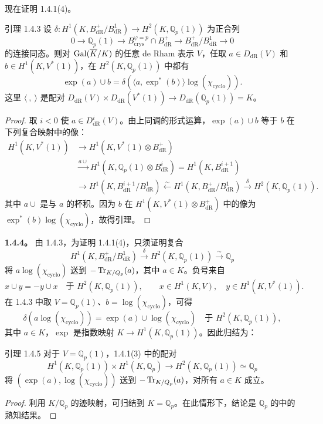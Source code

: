 现在证明 1.4.1(4)。
\begin{statement}{引理 1.4.3}
设 $\delta:H^1(K,B^+_{\mathrm{dR}}/B^1_{\mathrm{dR}})\longrightarrow H^2(K,\mathbb Q_p(1))$ 为正合列
\[
 0\longrightarrow\mathbb Q_p(1)\longrightarrow B_{\mathrm{crys}}^{\varphi=p}\cap B^+_{\mathrm{dR}}
 \longrightarrow B^+_{\mathrm{dR}}/B^1_{\mathrm{dR}}\longrightarrow0
\]
的连接同态。则对 $\operatorname{Gal}(\overline K/K)$ 的任意 de Rham 表示 $V$，任取 $a\in D_{\mathrm{dR}}(V)$ 和 $b\in H^1(K,V^*(1))$，在 $H^2(K,\mathbb Q_p(1))$ 中都有
\[
 \exp(a)\cup b=\delta(\langle a,\exp^*(b)\rangle\log(\chi_{\mathrm{cyclo}})).
\]
这里 $\langle\ ,\ \rangle$ 是配对
$D_{\mathrm{dR}}(V)\times D_{\mathrm{dR}}(V^*(1))\longrightarrow D_{\mathrm{dR}}(\mathbb Q_p(1))=K$。
\end{statement}
\begin{proof}
取 $i<0$ 使 $a\in D^i_{\mathrm{dR}}(V)$。由上同调的形式运算，$\exp(a)\cup b$ 等于 $b$ 在下列复合映射中的像：
\begin{align*}
 H^1(K,V^*(1))&\longrightarrow H^1(K,V^*(1)\otimes B^+_{\mathrm{dR}})\\
 &\xrightarrow{a\cup}H^1(K,\mathbb Q_p(1)\otimes B^i_{\mathrm{dR}})
 =H^1(K,B^{i+1}_{\mathrm{dR}})\\
 &\longrightarrow H^1(K,B^{i+1}_{\mathrm{dR}}/B^1_{\mathrm{dR}})
 \xleftarrow{\sim}H^1(K,B^+_{\mathrm{dR}}/B^1_{\mathrm{dR}})
 \xrightarrow{\delta}H^2(K,\mathbb Q_p(1)).
\end{align*}
其中 $a\cup$ 是与 $a$ 的杯积。因为 $b$ 在 $H^1(K,V^*(1)\otimes B^+_{\mathrm{dR}})$ 中的像为 $\exp^*(b)\log(\chi_{\mathrm{cyclo}})$，故得引理。
\end{proof}

\textbf{1.4.4。} 由 1.4.3，为证明 1.4.1(4)，只须证明复合
\[
 H^1(K,B^+_{\mathrm{dR}}/B^1_{\mathrm{dR}})\xrightarrow{\delta}H^2(K,\mathbb Q_p(1))\xrightarrow{\sim}\mathbb Q_p
\]
将 $a\log(\chi_{\mathrm{cyclo}})$ 送到 $-\operatorname{Tr}_{K/Q_p}(a)$，其中 $a\in K$。负号来自
\[
 x\cup y=-y\cup x\quad\text{于 }H^2(K,\mathbb Q_p(1)),\qquad
 x\in H^1(K,V),\quad y\in H^1(K,V^*(1)).
\]
在 1.4.3 中取 $V=\mathbb Q_p(1)$、$b=\log(\chi_{\mathrm{cyclo}})$，可得
\[
 \delta(a\log(\chi_{\mathrm{cyclo}}))=\exp(a)\cup\log(\chi_{\mathrm{cyclo}})
 \quad\text{于 }H^2(K,\mathbb Q_p(1)),
\]
其中 $a\in K$，$\exp$ 是指数映射 $K\longrightarrow H^1(K,\mathbb Q_p(1))$。因此归结为：
\begin{statement}{引理 1.4.5}
对于 $V=\mathbb Q_p(1)$，1.4.1(3) 中的配对
\[
 H^1(K,\mathbb Q_p(1))\times H^1(K,\mathbb Q_p)\longrightarrow H^2(K,\mathbb Q_p(1))\simeq\mathbb Q_p
\]
将 $(\exp(a),\log(\chi_{\mathrm{cyclo}}))$ 送到 $-\operatorname{Tr}_{K/Q_p}(a)$，对所有 $a\in K$ 成立。
\end{statement}
\begin{proof}
利用 $K/\mathbb Q_p$ 的迹映射，可归结到 $K=\mathbb Q_p$。在此情形下，结论是 $\mathbb Q_p$ 的中的熟知结果。
\end{proof}

